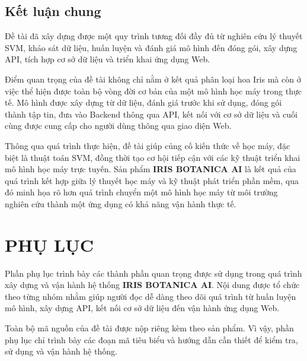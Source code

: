 \documentclass[14pt]{extarticle}
\begin{document}
	\subsection{Kết luận chung}
	
	\noindent Đề tài đã xây dựng được một quy trình tương đối đầy đủ từ nghiên cứu lý thuyết SVM, khảo sát dữ liệu, huấn luyện và đánh giá mô hình đến đóng gói, xây dựng API, tích hợp cơ sở dữ liệu và triển khai ứng dụng Web.
	
	\noindent Điểm quan trọng của đề tài không chỉ nằm ở kết quả phân loại hoa Iris mà còn ở việc thể hiện được toàn bộ vòng đời cơ bản của một mô hình học máy trong thực tế. Mô hình được xây dựng từ dữ liệu, đánh giá trước khi sử dụng, đóng gói thành tập tin, đưa vào Backend thông qua API, kết nối với cơ sở dữ liệu và cuối cùng được cung cấp cho người dùng thông qua giao diện Web.
	
	\noindent Thông qua quá trình thực hiện, đề tài giúp củng cố kiến thức về học máy, đặc biệt là thuật toán SVM, đồng thời tạo cơ hội tiếp cận với các kỹ thuật triển khai mô hình học máy trực tuyến. Sản phẩm \textbf{IRIS BOTANICA AI} là kết quả của quá trình kết hợp giữa lý thuyết học máy và kỹ thuật phát triển phần mềm, qua đó minh họa rõ hơn quá trình chuyển một mô hình học máy từ môi trường nghiên cứu thành một ứng dụng có khả năng vận hành thực tế.
	

	
	\newpage
	\section*{PHỤ LỤC}
	
	\noindent
	Phần phụ lục trình bày các thành phần quan trọng được sử dụng trong quá
	trình xây dựng và vận hành hệ thống \textbf{IRIS BOTANICA AI}. Nội dung
	được tổ chức theo từng nhóm nhằm giúp người đọc dễ dàng theo dõi quá trình
	từ huấn luyện mô hình, xây dựng API, kết nối cơ sở dữ liệu đến vận hành
	ứng dụng Web.
	
	\noindent
	Toàn bộ mã nguồn của đề tài được nộp riêng kèm theo sản phẩm. Vì vậy,
	phần phụ lục chỉ trình bày các đoạn mã tiêu biểu và hướng dẫn cần thiết
	để kiểm tra, sử dụng và vận hành hệ thống.
	
	
	
\end{document}
